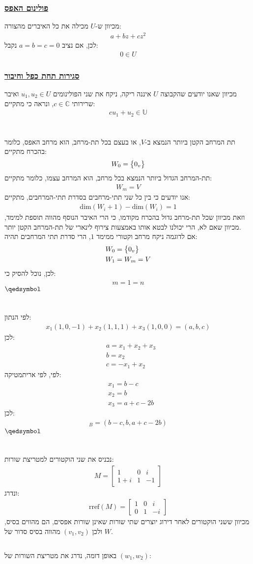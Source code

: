 \documentclass[a4paper, 12pt, leqno]{article}
\newcommand{\sub}[1]{\subsection{\underline{#1}}}
\newcommand{\subsub}[1]{\subsubsection{\underline{#1}}}
\newcommand{\eq}[1]{\begin{align*}#1\end{align*}}
\newcommand{\set}[1]{\big{\{} #1 \big{\}}}
\renewcommand{\qed}{\hfill\(\qedsymbol\)}
\begin{document}
\section{}
\sub{}
\subsub{פולינום האפס}
מכיוון ש-$U$ מכילה את כל האיברים מהצורה:
\eq{
    a+bz+{cz}^2
}
לכן, אם נציב $a=b=c=0$ נקבל:
\eq{
    0\in{U}
}
\subsub{סגירות תחת כפל וחיבור}
מכיוון שאנו יודעים שהקבוצה $U$ איננה ריקה, ניקח את שני הפולינומים $u_1,u_2\in{U}$ ואיבר שרירותי $c\in\mathbb{C}$, ונראה כי מתקיים:
\eq{
    cu_1+u_2\in\mathbb{U}
}

\setcounter{section}{12}
\section{}
תת המרחב הקטן ביותר הנמצא ב-$V$, או בעצם בכל תת-מרחב, הוא מרחב האפס, כלומר בהכרח מתקיים:
\eq{
    W_0=\set{0_v}
}
תת-המרחב הגדול ביותר הנמצא בכל מרחב, הוא המרחב עצמו, כלומר מתקיים:
\eq{
    W_m=V
}
אנו יודעים כי בין כל שני תתי-מרחבים בסדרת תתי-המרחבים, מתקיים:
\eq{
    \text{dim}(W_i+1)-\text{dim}(W_i)=1
}
וזאת מכיוון שכל תת-מרחב גדול בהכרח מקודמו, כי הרי האיבר הנוסף מהווה תוספת למימד, מכיוון שאם לא,
הרי יכולנו לבטא אותו באמצעות צירוף לינארי של תת-המרחב הקטן יותר.\\
אם לדוגמה ניקח מרחב וקטורי ממימד $1$, הרי סדרת תתי המרחבים תהיה:
\eq{
    &W_0=\set{0_v}\\
    &W_1=W_m=V
}
לכן, נוכל להסיק כי:
\eq{
    m=1=n
}
\qed

\setcounter{section}{17}
\section{}
לפי הנתון:
\eq{
    x_1(1,0,-1)+x_2(1,1,1)+x_3(1,0,0)=(a,b,c)
}
לכן:
\eq{
    &a=x_1+x_2+x_3\\
    &b=x_2\\
    &c=-x_1+x_2
}
לפי, לפי אריתמטיקה:
\eq{
    &x_1=b-c\\
    &x_2=b\\
    &x_3=a+c-2b
}
לכן:
\eq{
    [(a,b,c)]_B=(b-c,b,a+c-2b)
}
\qed

\section{}
\sub{}
נכניס את שני הוקטורים למטריצת שורות:
\eq{
    M=\begin{bmatrix}
        1&0&i\\
        1+i&1&-1
    \end{bmatrix}
}
ונדרג:
\eq{
    \text{rref}(M)=\begin{bmatrix}
        1&0&i\\
        0&1&-i
    \end{bmatrix}
}
מכיוון ששני הוקטורים לאחר דירוג יוצרים שתי שורות שאינן שורות אפסים, הם מהווים בסיס, ולכן $(v_1,v_2)$ מהווה בסיס סדור של $W$.
\sub{}
באופן דומה, נדרג את מטריצת השורות של $(w_1,w_2)$:
\end{document}
